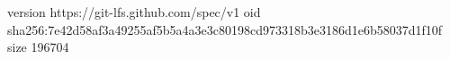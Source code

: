 version https://git-lfs.github.com/spec/v1
oid sha256:7e42d58af3a49255af5b5a4a3e3c80198cd973318b3e3186d1e6b58037d1f10f
size 196704
